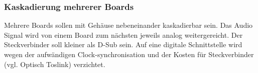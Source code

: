 \subsubsection{Kaskadierung mehrerer Boards}
\label{sec:Konzept_Kaskadierung}

Mehrere Boards sollen mit Gehäuse nebeneinander kaskadierbar sein. 
Das Audio Signal wird von einem Board zum nächsten jeweils analog weitergereicht. 
Der Steckverbinder soll kleiner als D-Sub sein. 
Auf eine digitale Schnittstelle wird wegen der aufwändigen Clock-synchronisation und der Kosten für Steckverbinder (vgl. Optisch Toslink) verzichtet.

